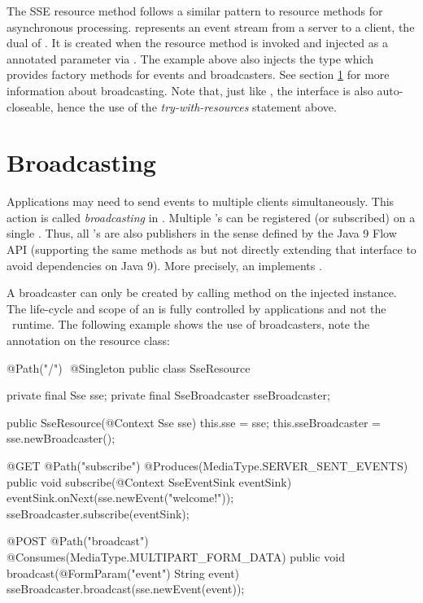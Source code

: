The SSE resource method follows a similar pattern to resource methods for asynchronous processing.  represents an event stream from a server to a client, the dual of . It is created when the resource method is invoked and injected as a annotated parameter via . The example above also injects the  type which provides factory methods for events and broadcasters. See section \ref{sse_broadcasting} for more information about broadcasting. Note that, just like , the interface  is also auto-closeable, hence the use of the \emph{try-with-resources} statement above.

\section{Broadcasting}
\label{sse_broadcasting}

Applications may need to send events to multiple clients simultaneously. This action is called \emph{broadcasting} in \jaxrs. Multiple 's can be registered (or subscribed) on a single . Thus, all 's are also publishers in the sense defined by the Java 9 Flow API (supporting the same methods as  but not directly extending that interface to avoid dependencies on Java 9). More precisely, an  implements .

A broadcaster can only be created by calling method  on the injected  instance. The life-cycle and scope of an  is fully controlled by applications and not the \jaxrs\ runtime. The following example shows the use of broadcasters, note the  annotation on the resource class:

\begin{listing}{1}
@Path("/") 
@Singleton
public class SseResource {
	
  private final Sse sse;
  private final SseBroadcaster sseBroadcaster;
	
  public SseResource(@Context Sse sse) {
    this.sse = sse;
    this.sseBroadcaster = sse.newBroadcaster();
  }  
	
  @GET
  @Path("subscribe")
  @Produces(MediaType.SERVER_SENT_EVENTS)
  public void subscribe(@Context SseEventSink eventSink) {
    eventSink.onNext(sse.newEvent("welcome!"));
    sseBroadcaster.subscribe(eventSink);
  }  
	
  @POST
  @Path("broadcast")
  @Consumes(MediaType.MULTIPART_FORM_DATA)
  public void broadcast(@FormParam("event") String event) { 
    sseBroadcaster.broadcast(sse.newEvent(event));
  } 
}
\end{listing}

